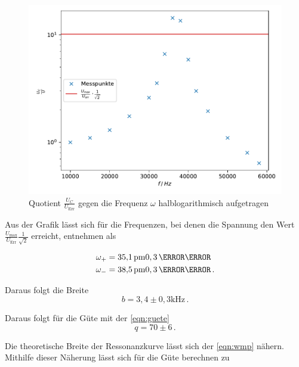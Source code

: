 \begin{figure}
    \centering
    \label{fig:1}
    \includegraphics{Daten/c.pdf}
    \caption{Quotient $\frac{U_C}{U_\text{Err}}$ gegen die Frequenz $\omega$ halblogarithmisch aufgetragen}
\end{figure}


\noindent
Aus der Grafik lässt sich für die Frequenzen, bei denen die Spannung den Wert $\frac{U_\text{max}}{U_\text{Err}}\frac{1}{\sqrt{2}}$ erreicht, entnehmen als

\begin{align*}
    \omega_+ &= \SI{35,1} \pm 0,3 \,  {\kilo\hertz} \\
    \omega_- &= \SI{38,5} \pm 0,3 \,  {\kilo\hertz} \, .
\end{align*}

\noindent
Daraus folgt die Breite 
\begin{equation*}
    b = 3,4 \pm 0,3 \si{\kilo\hertz} \, .
\end{equation*}

Daraus folgt für die Güte mit der \autoref{eqn:guete} $$ q = 70 \pm 6 \, .$$ 

\noindent
Die theoretische Breite der Ressonanzkurve lässt sich der \autoref{eqn:wmp} nähern. Mithilfe dieser Näherung lässt sich für die Güte berechnen zu %




